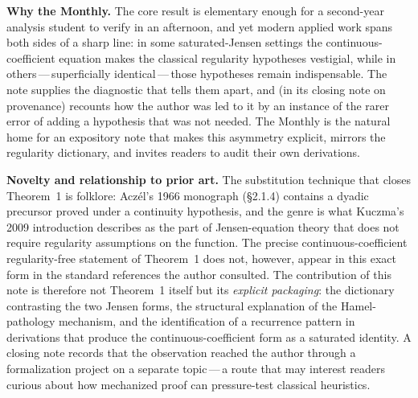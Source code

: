 \documentclass[12pt]{article}
\begin{document}
\bigskip
\noindent\textbf{Why the Monthly.}
The core result is elementary enough for a second-year analysis student
to verify in an afternoon, and yet modern applied work spans both
sides of a sharp line: in some saturated-Jensen settings the
continuous-coefficient equation makes the classical regularity
hypotheses vestigial, while in others\,---\,superficially
identical\,---\,those hypotheses remain indispensable. The note
supplies the diagnostic that tells them apart, and (in its closing
note on provenance) recounts how the author was led to it by an
instance of the rarer error of adding a hypothesis that was not
needed. The Monthly is the natural home for an expository note that
makes this asymmetry explicit, mirrors the regularity dictionary, and
invites readers to audit their own derivations.

\bigskip
\noindent\textbf{Novelty and relationship to prior art.}
The substitution technique that closes Theorem~1 is folklore:
Acz\'{e}l's 1966 monograph (\S2.1.4) contains a dyadic precursor proved
under a continuity hypothesis, and the genre is what Kuczma's 2009
introduction describes as the part of Jensen-equation theory that does
not require regularity assumptions on the function. The precise
continuous-coefficient regularity-free statement of Theorem~1 does
not, however, appear in this exact form in the standard references the
author consulted. The contribution of this note is therefore not
Theorem~1 itself but its \emph{explicit packaging}: the dictionary
contrasting the two Jensen forms, the structural explanation of the
Hamel-pathology mechanism, and the identification of a recurrence
pattern in derivations that produce the continuous-coefficient form as
a saturated identity. A closing note records that the observation
reached the author through a formalization project on a separate
topic\,---\,a route that may interest readers curious about how
mechanized proof can pressure-test classical heuristics.
\end{document}
